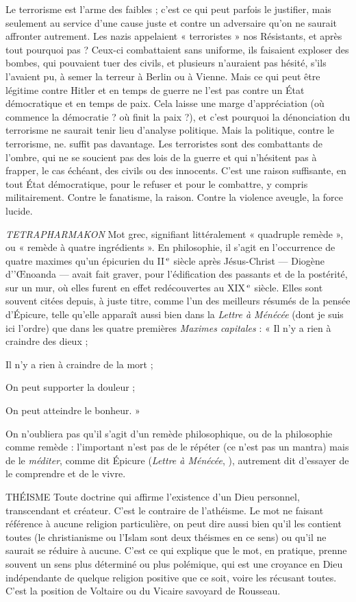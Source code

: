 Le terrorisme est l’arme des faibles ; c’est ce qui peut parfois le justifier, mais
seulement au service d’une cause juste et contre un adversaire qu'on ne saurait
affronter autrement. Les nazis appelaient « terroristes » nos Résistants, et après
tout pourquoi pas ? Ceux-ci combattaient sans uniforme, ils faisaient exploser des
bombes, qui pouvaient tuer des civils, et plusieurs n'auraient pas hésité, s’ils
l'avaient pu, à semer la terreur à Berlin ou à Vienne. Mais ce qui peut être légitime
contre Hitler et en temps de guerre ne l’est pas contre un État démocratique
et en temps de paix. Cela laisse une marge d’appréciation (où commence la
démocratie ? où finit la paix ?), et c’est pourquoi la dénonciation du terrorisme ne
saurait tenir lieu d’analyse politique. Mais la politique, contre le terrorisme, ne.
suffit pas davantage. Les terroristes sont des combattants de l'ombre, qui ne se
soucient pas des lois de la guerre et qui n’hésitent pas à frapper, le cas échéant, des
civils ou des innocents. C’est une raison suffisante, en tout État démocratique,
pour le refuser et pour le combattre, y compris militairement. Contre le fanatisme,
la raison. Contre la violence aveugle, la force lucide.

{\it TETRAPHARMAKON} Mot grec, signifiant littéralement « quadruple remède »,
ou « remède à quatre ingrédients ». En philosophie,
il s’agit en l'occurrence de quatre maximes qu’un épicurien du {\footnotesize II}$^\text{\,e}$ siècle après
Jésus-Christ — Diogène d’'Œnoanda — avait fait graver, pour l'édification des passants
et de la postérité, sur un mur, où elles furent en effet redécouvertes au {\footnotesize XIX}$^\text{\,e}$
siècle. Elles sont souvent citées depuis, à juste titre, comme l’un des meilleurs
résumés de la pensée d’Épicure, telle qu’elle apparaît aussi bien dans la {\it Lettre à
Ménécée} (dont je suis ici l’ordre) que dans les quatre premières {\it Maximes capitales} :
« Il n’y a rien à craindre des dieux ;

Il n’y a rien à craindre de la mort ;

On peut supporter la douleur ;

On peut atteindre le bonheur. »

On n’oubliera pas qu’il s’agit d’un remède philosophique, ou de la philosophie
comme remède : l'important n’est pas de le répéter (ce n’est pas un
mantra) mais de le {\it méditer}, comme dit Épicure ({\it Lettre à Ménécée}, ),
autrement dit d’essayer de le comprendre et de le vivre.

THÉISME Toute doctrine qui affirme l'existence d’un Dieu personnel,
transcendant et créateur. C’est le contraire de l’athéisme. Le mot
ne faisant référence à aucune religion particulière, on peut dire aussi bien qu’il les
contient toutes (le christianisme ou l’Islam sont deux théismes en ce sens) ou
qu'il ne saurait se réduire à aucune. C’est ce qui explique que le mot, en pratique,
prenne souvent un sens plus déterminé ou plus polémique, qui est une croyance
en Dieu indépendante de quelque religion positive que ce soit, voire les récusant
toutes. C’est la position de Voltaire ou du Vicaire savoyard de Rousseau.

